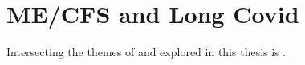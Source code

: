 



\section{ME/CFS and Long Covid}

Intersecting the themes of \cfs and \covid explored in this thesis is \LC.

